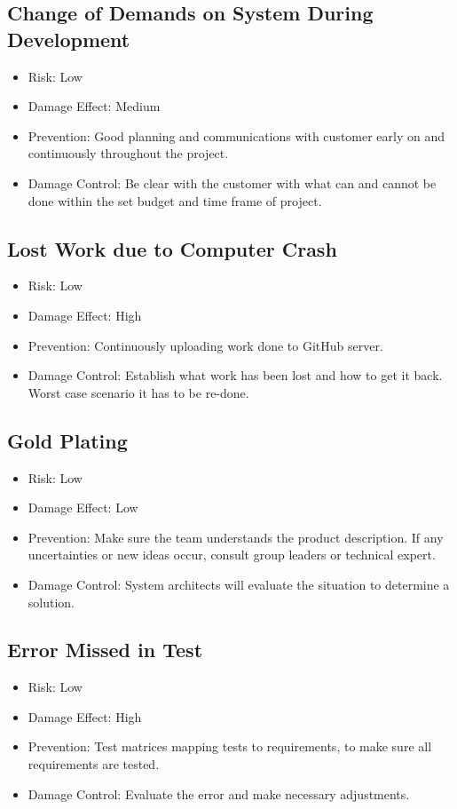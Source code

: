 \documentclass[a4paper]{article}
\begin{document}
\subsection{Change of Demands on System During Development}
\begin{itemize}
\item Risk: Low
\item Damage Effect: Medium
\item Prevention: Good planning and communications with customer early on and continuously throughout the project.
\item Damage Control: Be clear with the customer with what can and cannot be done within the set budget and time frame of project.
\end{itemize}

\subsection{Lost Work due to Computer Crash}
\begin{itemize}
\item Risk: Low
\item Damage Effect: High
\item Prevention: Continuously uploading work done to GitHub server.
\item Damage Control: Establish what work has been lost and how to get it back. Worst case scenario it has to be re-done.
\end{itemize}

\subsection{Gold Plating}
\begin{itemize}
\item Risk: Low
\item Damage Effect: Low
\item Prevention: Make sure the team understands the product description. If any uncertainties or new ideas occur, consult group leaders or technical expert.
\item Damage Control: System architects will evaluate the situation to determine a solution.
\end{itemize}

\subsection{Error Missed in Test}
\begin{itemize}
\item Risk: Low
\item Damage Effect: High
\item Prevention: Test matrices mapping tests to requirements, to make sure all requirements are tested.
\item Damage Control: Evaluate the error and make necessary adjustments.
\end{itemize}
\end{document}
